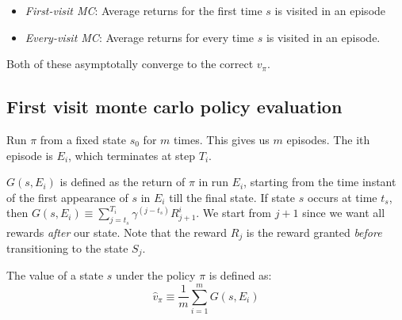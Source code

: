 \documentclass[11pt]{book}
\begin{document}
\begin{itemize}
    \item \emph{First-visit MC}: Average returns for the first time $s$ is visited in an episode
    \item \emph{Every-visit MC}: Average returns for every time $s$ is visited in an episode.
\end{itemize}
Both of these asymptotally converge to the correct $v_{\pi}$.

\subsection{First visit monte carlo policy evaluation}

Run $\pi$ from a fixed state $s_0$ for $m$ times. This gives us $m$ episodes. The ith episode
is $E_i$, which terminates at step $T_i$.

$G(s, E_i)$ is defined as the return of $\pi$ in run $E_i$, starting from the time instant of the first
appearance of $s$ in $E_i$ till the final state. If state $s$ occurs at time
$t_s$, then ${G(s, E_i) \equiv \sum_{j=t_s}^{T_i} \gamma^{(j - t_s)} R^i_{j+1}}$.
We start from $j+1$ since we want all rewards \emph{after} our state. Note that
the reward $R_j$ is the reward granted \emph{before} transitioning to the state $S_j$.

The value of a state $s$ under the policy $\pi$ is defined as:
$$\hat v_\pi \equiv \frac{1}{m} \sum_{i=1}^m G(s, E_i)$$
\end{document}
